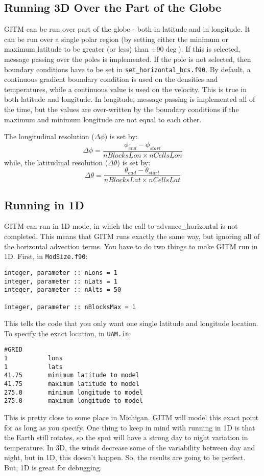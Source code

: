 \subsection{Running 3D Over the Part of the Globe}

GITM can be run over part of the globe - both in latitude and in
longitude.  It can be run over a single polar region (by setting
either the minimum or maximum latitude to be greater (or less) than
$\pm 90\deg$).  If this is selected, message passing over the poles is
implemented.  If the pole is not selected, then boundary conditions
have to be set in {\tt set\_horizontal\_bcs.f90}.  By default, a
continuous gradient boundary condition is used on the densities and
temperatures, while a continuous value is used on the velocity.  This
is true in both latitude and longitude.  In longitude, message passing
is implemented all of the time, but the values are over-written by the
boundary conditions if the maximum and minimum longitude are not equal
to each other.

The longitudinal resolution ($\Delta{\phi}$) is set by:
\begin{equation}
\Delta{\phi} = \frac{\phi_{end} - \phi_{start}}{nBlocksLon \times nCellsLon}
\end{equation}
while, the latitudinal resolution ($\Delta{\theta}$) is set by:
\begin{equation}
\Delta{\theta} = \frac{\theta_{end} - \theta_{start}}{nBlocksLat \times nCellsLat}
\end{equation}

\subsection{Running in 1D}

GITM can run in 1D mode, in which the call to advance\_horizontal is
not completed.  This means that GITM runs exactly the same way, but
ignoring all of the horizontal advection terms.  You have to do two
things to make GITM run in 1D.  First, in {\tt ModSize.f90}:
\begin{verbatim}
integer, parameter :: nLons = 1
integer, parameter :: nLats = 1
integer, parameter :: nAlts = 50

integer, parameter :: nBlocksMax = 1
\end{verbatim}
This tells the code that you only want one single latitude and
longitude location.  To specify the exact location, in {\tt UAM.in}:
\begin{verbatim}
#GRID
1           lons
1           lats
41.75       minimum latitude to model
41.75       maximum latitude to model
275.0       minimum longitude to model
275.0       maximum longitude to model
\end{verbatim}
This is pretty close to some place in Michigan.  GITM will model this
exact point for as long as you specify.  One thing to keep in mind
with running in 1D is that the Earth still rotates, so the spot will
have a strong day to night variation in temperature.  In 3D, the winds
decrease some of the variability between day and night, but in 1D,
this doesn't happen.  So, the results are going to be perfect.  But,
1D is great for debugging.

